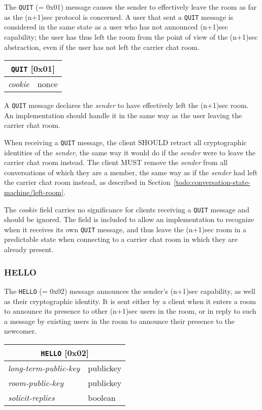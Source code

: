 \documentclass{article}
\def\message#1{\texttt{#1}}
\def\field#1{\textit{#1}}
\newenvironment{basicmessage}[2]{
\newcommand{\messagefield}[2]{
\field{##1} & \textsf{##2} \\
\hline
}
\begin{tabular}{|l|l|}
\hline
\multicolumn{2}{|c|}{\message{#1} [#2]} \\
\hline
\hline
}{
\end{tabular}
}
\begin{document}
The \message{QUIT} (= 0x01) message causes the sender to effectively leave the room as far as the (n+1)sec protocol is concerned.
A user that sent a \message{QUIT} message is considered in the same state as a user who has not announced (n+1)sec capability; the user has thus left the room from the point of view of the (n+1)sec abstraction, even if the user has not left the carrier chat room.

\begin{basicmessage}{QUIT}{0x01}
\messagefield{cookie}{nonce}
\end{basicmessage}

A \message{QUIT} message declares the \field{sender} to have effectively left the (n+1)sec room.
An implementation should handle it in the same way as the user leaving the carrier chat room.

When receiving a \message{QUIT} message, the client SHOULD retract all cryptographic identities of the \field{sender}, the same way it would do if the \field{sender} were to leave the carrier chat room instead.
The client MUST remove the \field{sender} from all conversations of which they are a member, the same way as if the \field{sender} had left the carrier chat room instead, as described in Section~\ref{todo:conversation-state-machine/left-room}.

The \field{cookie} field carries no significance for clients receiving a \message{QUIT} message and should be ignored.
The field is included to allow an implementation to recognize when it receives its own \message{QUIT} message, and thus leave the (n+1)sec room in a predictable state when connecting to a carrier chat room in which they are already present.


\subsubsection{HELLO}
\label{sec:messages/hello}

The \message{HELLO} (= 0x02) message announces the sender's (n+1)sec capability, as well as their cryptographic identity.
It is sent either by a client when it enters a room to announce its presence to other (n+1)sec users in the room, or in reply to such a message by existing users in the room to announce their presence to the newcomer.

\begin{basicmessage}{HELLO}{0x02}
\messagefield{long-term-public-key}{publickey}
\messagefield{room-public-key}{publickey}
\messagefield{solicit-replies}{boolean}
\end{basicmessage}
\end{document}
